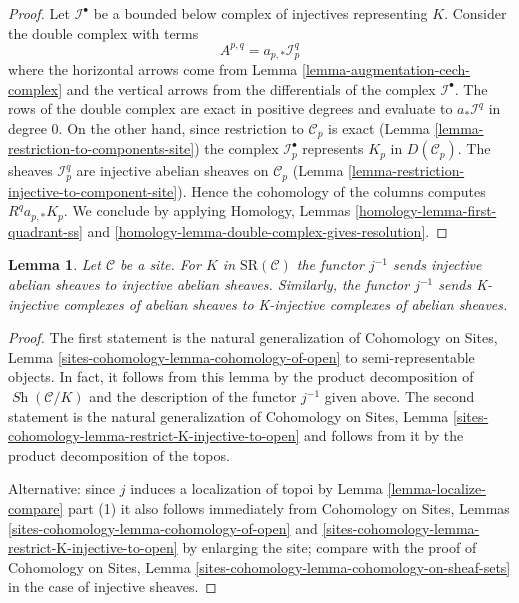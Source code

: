 \documentclass[10pt,a4paper]{amsart}
\theoremstyle{plain}
\newtheorem{lemma}[subsection]{Lemma}
\theoremstyle{definition}
\theoremstyle{remark}
\numberwithin{equation}{subsection}
\def\Sh{\mathop{\mathit{Sh}}\nolimits}
\begin{document}
\begin{proof}
Let $\mathcal{I}^\bullet$ be a bounded below complex of injectives
representing $K$. Consider the double complex with terms
$$
A^{p, q} = a_{p, *}\mathcal{I}^q_p
$$
where the horizontal arrows come from
Lemma \ref{lemma-augmentation-cech-complex}
and the vertical arrows from the differentials of the
complex $\mathcal{I}^\bullet$. The rows of the double complex are exact
in positive degrees and evaluate to $a_*\mathcal{I}^q$ in degree $0$.
On the other hand, since restriction to $\mathcal{C}_p$ is exact
(Lemma \ref{lemma-restriction-to-components-site})
the complex $\mathcal{I}_p^\bullet$ represents $K_p$ in
$D(\mathcal{C}_p)$. The sheaves $\mathcal{I}_p^q$ are injective
abelian sheaves on $\mathcal{C}_p$
(Lemma \ref{lemma-restriction-injective-to-component-site}).
Hence the cohomology of the columns computes $R^qa_{p, *}K_p$.
We conclude by applying
Homology, Lemmas \ref{homology-lemma-first-quadrant-ss} and
\ref{homology-lemma-double-complex-gives-resolution}.
\end{proof}

\begin{lemma}
\label{lemma-localize-injective}
Let $\mathcal{C}$ be a site. For $K$ in $\text{SR}(\mathcal{C})$
the functor $j^{-1}$ sends injective abelian sheaves to injective
abelian sheaves. Similarly, the functor $j^{-1}$ sends K-injective
complexes of abelian sheaves to K-injective complexes of
abelian sheaves.
\end{lemma}

\begin{proof}
The first statement is the natural generalization of
Cohomology on Sites, Lemma
\ref{sites-cohomology-lemma-cohomology-of-open}
to semi-representable objects.
In fact, it follows from this lemma
by the product decomposition of $\Sh(\mathcal{C}/K)$
and the description of the functor $j^{-1}$ given above.
The second statement is the natural generalization of
Cohomology on Sites, Lemma
\ref{sites-cohomology-lemma-restrict-K-injective-to-open}
and follows from it by the product decomposition of the topos.

\medskip\noindent
Alternative: since $j$ induces a localization of topoi by
Lemma \ref{lemma-localize-compare} part (1)
it also follows immediately from
Cohomology on Sites, Lemmas \ref{sites-cohomology-lemma-cohomology-of-open}
and \ref{sites-cohomology-lemma-restrict-K-injective-to-open}
by enlarging the site; compare with the proof of
Cohomology on Sites, Lemma
\ref{sites-cohomology-lemma-cohomology-on-sheaf-sets}
in the case of injective sheaves.
\end{proof}
\end{document}
